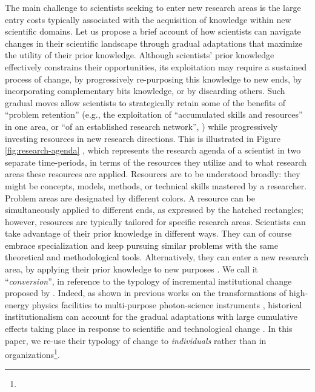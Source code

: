 \documentclass{article}
\begin{document}
The main challenge to scientists seeking to enter new research areas is the large entry costs typically associated with the acquisition of knowledge within new scientific domains. Let us propose a brief account of how scientists can navigate changes in their scientific landscape through gradual adaptations that maximize the utility of their prior knowledge. Although scientists' prior knowledge effectively constrains their opportunities, its exploitation may require a sustained process of change, by progressively re-purposing this knowledge to new ends, by incorporating complementary bits knowledge, or by discarding others. Such gradual moves allow scientists to strategically retain some of  the benefits of ``problem retention'' (e.g., the exploitation of ``accumulated skills and resources'' in one area, or ``of an established research network'', \citealt[p.~106]{Gieryn1978}) while progressively investing resources in new research directions. This is illustrated in Figure \ref{fig:research-agenda} %
, which represents the research agenda of a scientist in two separate time-periods, in terms of the resources they utilize and to what research areas these resources are applied. Resources are to be understood broadly: they might be concepts, models, methods, or technical skills mastered by a researcher. Problem areas are designated by different colors. A resource can be simultaneously applied to different ends, as expressed by the hatched rectangles; however, resources are typically tailored for specific research areas. Scientists can take advantage of their prior knowledge in different ways. They can of course embrace specialization and keep pursuing similar problems with the same theoretical and methodological tools.  
Alternatively, they can enter a new research area, by applying their prior knowledge to new purposes \citep{Mulkay1974,schon1963displacement}. We call it ``\textit{conversion}'', in reference to the typology of incremental institutional change proposed by \citet{mahoney_thelen_2009}. Indeed, as shown in previous works on the transformations of high-energy physics facilities to multi-purpose photon-science instruments  \citep{Hallonsten2013,Heinze2017a}, historical institutionalism can account for the gradual adaptations with large cumulative effects taking place in response to scientific and technological change \citep{Heinze2012}. In this paper, we re-use their typology of change to  \textit{individuals} rather than in organizations\footnote{}. 
\end{document}
